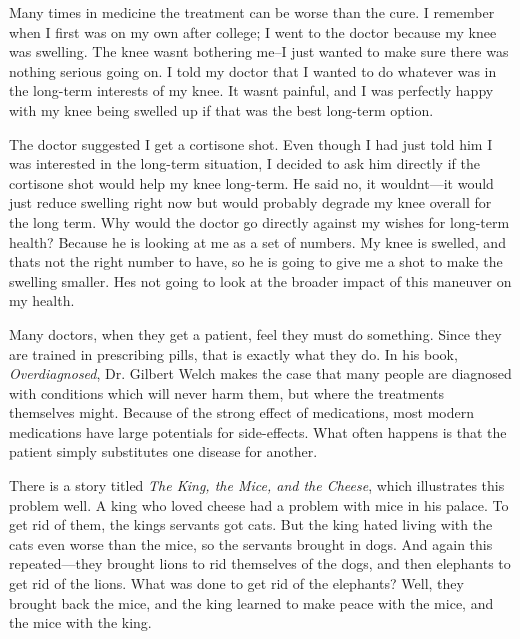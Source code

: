 \documentclass[letterpaper]{article}
\begin{document}
{\color{black}
Many times in medicine the treatment can be worse than the cure. I
remember when I first was on my own after college; I went to the doctor
because my knee was swelling. The knee wasn{\textquotesingle}t
bothering me–I just wanted to make sure there was nothing serious
\textcolor[rgb]{0.32941177,0.5529412,0.83137256}{going on}. I told my
doctor that I wanted to do whatever was in the long-term interests of
my knee. It wasn{\textquotesingle}t painful, and I was perfectly happy
with my knee being swelled up if that was the best long-term option. }

{\color{black}
The doctor suggested I get a cortisone shot. Even though I had just told
him I was interested in the long-term situation, I decided to ask him
directly if the cortisone shot would help my knee long-term. He said
no, it wouldn{\textquotesingle}t—it would just reduce swelling right
now but would probably degrade my knee overall for the long term. Why
would the doctor go directly against my wishes for long-term health? 
Because he is looking at me as a set of numbers. My knee is swelled,
and that{\textquotesingle}s not the right number to have, so he is
going to give me a shot to make the swelling smaller.
He{\textquotesingle}s not going to look at the broader impact of this
maneuver on my health.}

{\color{black}
Many doctors, when they get a patient, feel they must do something.
Since they are trained in prescribing pills, that is exactly what they
do.  In his book, \textit{Overdiagnosed}, Dr. Gilbert Welch makes the
case that many people are diagnosed with conditions which will never
harm them, but where the treatments themselves might.  Because of the
strong effect of medications, most modern medications have large
potentials for side-effects. What often happens is that the patient
simply substitutes one disease for another. }

{\color{black}
There is a story titled \textit{The King, the Mice, and the Cheese},
which illustrates this problem well. A king who loved cheese had a
problem with mice in his palace. To get rid of them, the
king{\textquotesingle}s servants got cats. But the king hated living
with the cats even worse than the mice, so the servants brought in
dogs. And again this repeated—they brought lions to rid themselves of
the dogs, and then elephants to get rid of the lions. What was done to
get rid of the elephants?  Well, they brought back the mice, and the
king learned to make peace with the mice, and the mice with the king.}
\end{document}
